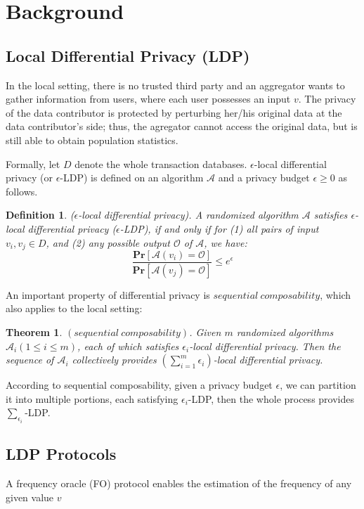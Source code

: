 \documentclass[conference]{IEEEtran}
\begin{document}
\section{Background}
\subsection{Local Differential Privacy (LDP)}
In the local setting, there is no trusted third party and an aggregator wants to gather information from users, where each user possesses an input $v$. The privacy of the data contributor is protected by perturbing her/his original data at the data contributor’s side; thus, the agregator cannot access the original data, but is still able to obtain population statistics.

Formally, let $D$ denote the whole  transaction databases. $\epsilon$-local differential privacy (or $\epsilon$-LDP) is defined on an algorithm $\mathcal{A}$ and a privacy budget $\epsilon \geq 0$ as follows.

\newtheorem{Definition}{\bf Definition}
\begin{Definition}
($\epsilon$-local differential privacy). A randomized algorithm $\mathcal{A}$ satisfies $\epsilon$-local differential privacy ($\epsilon$-LDP), if and only if for (1) all pairs of input $v_i,v_j \in D$, and (2) any possible output $\mathcal{O}$ of $\mathcal{A}$, we have:\\
$$\frac{\mathbf{Pr}[\mathcal{A}(v_i)=\mathcal{O}]}{\mathbf{Pr}[\mathcal{A}(v_j)=\mathcal{O}]} \leq e^{\epsilon}$$
\end{Definition}

An important property of differential privacy is $sequential\  composability$\cite{a9}, which also applies to the local setting:
\newtheorem{thm}{\bf Theorem}[section]
\begin{thm}\label{sequential composability}
$(sequential\  composability)$. Given $m$ randomized algorithms $\mathcal{A}_i(1 \leq i \leq m)$, each of which satisfies $\epsilon_i$-local differential privacy. Then the sequence of $\mathcal{A}_i$ collectively provides $(\sum_{i=1}^{m} \epsilon_i)$-local differential privacy. 
\end{thm}

According to sequential composability, given a privacy budget $\epsilon$, we can partition it into multiple portions, each satisfying $\epsilon_i$-LDP, then the whole process provides $\sum_{\epsilon_i}$-LDP.

\subsection{LDP Protocols}
A frequency oracle (FO) protocol enables the estimation of the frequency of any given value $v $ 
\end{document}
